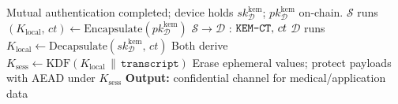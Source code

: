 \begin{algorithm}[!t]
\caption{Session Key Establishment (ML-KEM)}
\label{alg:sessionkey}
\begin{algorithmic}[1]
\Require Mutual authentication completed; device holds $sk_{\mathcal{D}}^{\mathrm{kem}}$; $pk_{\mathcal{D}}^{\mathrm{kem}}$ on-chain.
\State $\mathcal{S}$ runs $(K_{\mathrm{local}},\, ct) \gets \mathrm{Encapsulate}(pk_{\mathcal{D}}^{\mathrm{kem}})$ 
\State $\mathcal{S} \rightarrow \mathcal{D}$ : $\texttt{KEM\text{-}CT},\, ct$
\State $\mathcal{D}$ runs $K_{\mathrm{local}} \gets \mathrm{Decapsulate}(sk_{\mathcal{D}}^{\mathrm{kem}},\, ct)$
\State Both derive $K_{\mathrm{sess}} \gets \mathrm{KDF}(K_{\mathrm{local}} \,\|\, \texttt{transcript})$ 
\State Erase ephemeral values; protect payloads with AEAD under $K_{\mathrm{sess}}$
\State \textbf{Output:} confidential channel for medical/application data
\end{algorithmic}
\end{algorithm}
